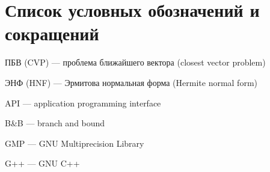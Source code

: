 \newpage

\section{Список условных обозначений и сокращений}

ПБВ (CVP) --- проблема ближайшего вектора (closest vector problem)

ЭНФ (HNF) --- Эрмитова нормальная форма (Hermite normal form)

API --- application programming interface

B\&B --- branch and bound

GMP --- GNU Multiprecision Library

G++ --- GNU C++


\clearpage